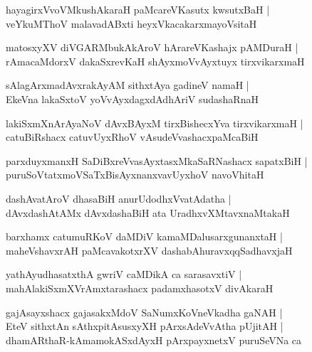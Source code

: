 \documentclass[twoside,12pt,openright]{book}
\newcounter{shloka}[chapter]
\begin{document}
\begin{shloka}%
hayagirxVvoVMkushAkaraH paMcareVKasutx kwsutxBaH |\\
veYkuMThoV malavadABxti heyxVkacakarxmayoVsitaH 
\end{shloka}

\begin{shloka}%
matosxyXV diVGARMbukAkAroV hArareVKashajx pAMDuraH |\\
rAmacaMdorxV dakaSxrevKaH shAyxmoVvAyxtuyx tirxvikarxmaH 
\end{shloka}

\begin{shloka}%
sAlagArxmadAvxrakAyAM sithxtAya gadineV namaH |\\
EkeVna lakaSxtoV yoVvAyxdagxdAdhAriV sudashaRnaH
\end{shloka}

\begin{shloka}%
lakiSxmXnArAyaNoV dAvxBAyxM tirxBishecxYva tirxvikarxmaH |\\
catuBiRshacx catuvUyxRhoV vAsudeVvashacxpaMcaBiH 
\end{shloka}

\begin{shloka}%
parxduyxmanxH SaDiBxreVvasAyxtasxMkaSaRNashacx sapatxBiH |\\
puruSoVtatxmoVSaTxBisAyxnanxvavUyxhoV navoVhitaH 
\end{shloka}

\begin{shloka}%
dashAvatAroV dhasaBiH anurUdodhxVvatAdatha |\\
dAvxdashAtAMx dAvxdashaBiH ata UradhxvXMtavxnaMtakaH
\end{shloka}

\begin{shloka}%
barxhamx catumuRKoV daMDiV kamaMDalusarxgunanxtaH |\\
maheVshavxrAH paMcavakotxrXV dashabAhuravxqqSadhavxjaH 
\end{shloka}

\begin{shloka}%
yathAyudhasatxthA gwriV caMDikA ca sarasavxtiV |\\
mahAlakiSxmXVrAmxtarashacx padamxhasotxV divAkaraH
\end{shloka}

\begin{shloka}%
gajAsayxshacx gajasakxMdoV SaNumxKoVneVkadha gaNAH |\\
EteV sithxtAn sAthxpitAsusxyXH pArxsAdeVvAtha pUjitAH |\\
dhamARthaR-kAmamokASxdAyxH pArxpayxnetxV puruSeVNa ca 
\end{shloka}
\end{document}
